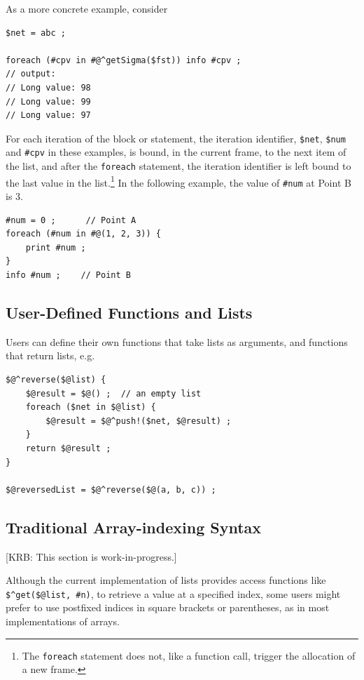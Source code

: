 \documentclass[letterpaper,12pt]{article}
\begin{document}
\noindent
As a more concrete example, consider

\begin{Verbatim}[fontsize=\small]
$net = abc ;

foreach (#cpv in #@^getSigma($fst)) info #cpv ;
// output:
// Long value: 98
// Long value: 99
// Long value: 97
\end{Verbatim}

For each iteration of the block or statement, the iteration identifier,
\verb!$net!, \verb!$num! and \verb!#cpv! in these examples, is bound, in
the current frame, to the next item of the list, and after the
\texttt{foreach} statement, the iteration identifier is left bound to the
last value in the list.\footnote{The \texttt{foreach} statement does not,
like a function call, trigger the allocation of a new frame.}  In the
following example, the value of \verb!#num! at Point B is 3.

\begin{Verbatim}[fontsize=\small]
#num = 0 ;      // Point A
foreach (#num in #@(1, 2, 3)) {
	print #num ;
}
info #num ;    // Point B
\end{Verbatim}

\subsection{User-Defined Functions and Lists}


Users can define their own functions that take lists as arguments, and functions
that return lists, e.g.\@

\begin{Verbatim}[fontsize=\small]
$@^reverse($@list) {
    $@result = $@() ;  // an empty list
    foreach ($net in $@list) {
        $@result = $@^push!($net, $@result) ;
    }
    return $@result ;
}

$@reversedList = $@^reverse($@(a, b, c)) ;
\end{Verbatim}


\subsection{Traditional Array-indexing Syntax}


[KRB:  This section is work-in-progress.]

Although the current implementation of lists provides access functions like
\verb!$^get($@list, #n)!, to retrieve a value at a specified index, 
some users might prefer to use postfixed indices in
square brackets or parentheses, as in most implementations of arrays.
\end{document}
